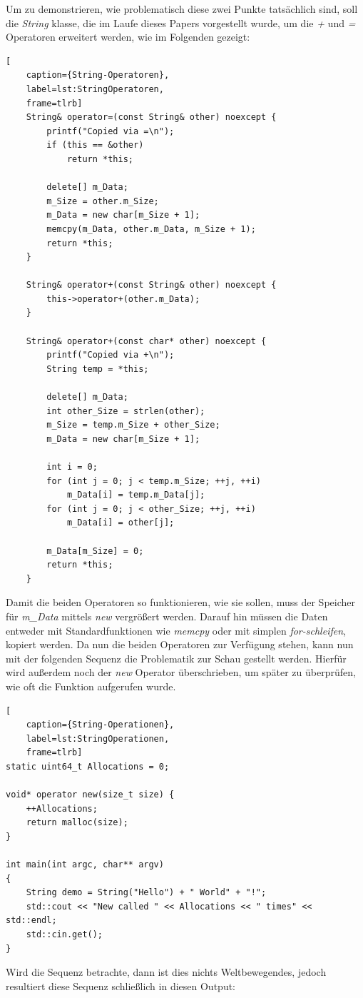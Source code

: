 Um zu demonstrieren, wie problematisch diese zwei Punkte tatsächlich sind, soll die \emph{String}
klasse, die im Laufe dieses Papers vorgestellt wurde, um die \emph{+} und \emph{=} Operatoren
erweitert werden, wie im Folgenden gezeigt:
\newpage
\begin{lstlisting}[
    caption={String-Operatoren},
    label=lst:StringOperatoren,
    frame=tlrb]
	String& operator=(const String& other) noexcept {
		printf("Copied via =\n");
		if (this == &other)
			return *this;

		delete[] m_Data;
		m_Size = other.m_Size;
		m_Data = new char[m_Size + 1];
		memcpy(m_Data, other.m_Data, m_Size + 1);
		return *this;
	}

	String& operator+(const String& other) noexcept {
		this->operator+(other.m_Data);
	}

	String& operator+(const char* other) noexcept {
		printf("Copied via +\n");
		String temp = *this;

		delete[] m_Data;
		int other_Size = strlen(other);
		m_Size = temp.m_Size + other_Size;
		m_Data = new char[m_Size + 1];

		int i = 0;
		for (int j = 0; j < temp.m_Size; ++j, ++i)
			m_Data[i] = temp.m_Data[j];
		for (int j = 0; j < other_Size; ++j, ++i)
			m_Data[i] = other[j];

		m_Data[m_Size] = 0;
		return *this;
	}
\end{lstlisting}

Damit die beiden Operatoren so funktionieren, wie sie sollen, muss der Speicher für \emph{m\_Data}
mittels \emph{new} vergrößert werden. Darauf hin müssen die Daten entweder mit Standardfunktionen
wie \emph{memcpy} oder mit simplen \emph{for-schleifen}, kopiert werden.
\newline
\newline
Da nun die beiden Operatoren zur Verfügung stehen, kann nun mit der folgenden Sequenz die
Problematik zur Schau gestellt werden. Hierfür wird außerdem noch der \emph{new} Operator
überschrieben, um später zu überprüfen, wie oft die Funktion aufgerufen wurde.

\begin{lstlisting}[
    caption={String-Operationen},
    label=lst:StringOperationen,
    frame=tlrb]
static uint64_t Allocations = 0;

void* operator new(size_t size) {
	++Allocations;
	return malloc(size);
}

int main(int argc, char** argv)
{
	String demo = String("Hello") + " World" + "!";
	std::cout << "New called " << Allocations << " times" << std::endl;
	std::cin.get();
}
\end{lstlisting}
Wird die Sequenz betrachte, dann ist dies nichts Weltbewegendes, jedoch resultiert diese Sequenz
schließlich in diesen Output:

